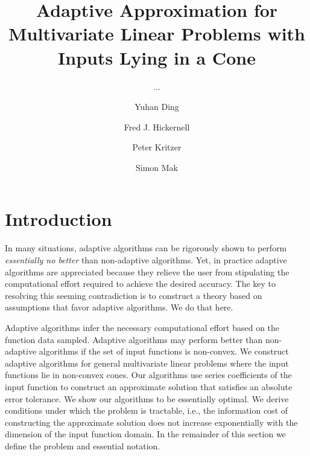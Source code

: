 \documentclass[USenglish]{article}
\theoremstyle{dgthm}
\theoremstyle{dgthm}
\theoremstyle{dgthm}
\theoremstyle{dgthm}
\theoremstyle{dgdef}
\theoremstyle{definition}
\begin{document}

  \author[1]{Yuhan Ding}
  \author*[2]{Fred J. Hickernell}
  \author[3]{Peter Kritzer} 
  \author[4]{Simon Mak}
  \title{Adaptive Approximation for Multivariate Linear Problems with Inputs Lying in a Cone}
  \subtitle{...}
  \aop

\maketitle


\section{Introduction} 

In many situations, adaptive algorithms can be rigorously shown to perform \emph{essentially no better} than non-adaptive algorithms.  Yet, in practice adaptive algorithms are appreciated because they relieve the user from stipulating the computational effort required to achieve the desired accuracy.  The key to resolving this seeming contradiction is to construct a theory based on assumptions that favor adaptive algorithms. We do that here.

Adaptive algorithms infer the necessary computational effort based on the function data sampled.  Adaptive algorithms may perform better than non-adaptive algorithms if the set of input functions is non-convex. We construct adaptive algorithms for general multivariate linear problems where the input functions lie in non-convex cones.  Our algorithms use series coefficients of the input function to construct an approximate solution that satisfies an absolute error tolerance.  We show our algorithms to be essentially optimal.  We derive conditions under which the problem is tractable, i.e., the information cost of constructing the approximate solution does not increase exponentially with the dimension of the input function domain.  In the remainder of this section we define the problem and essential notation.
\end{document}
